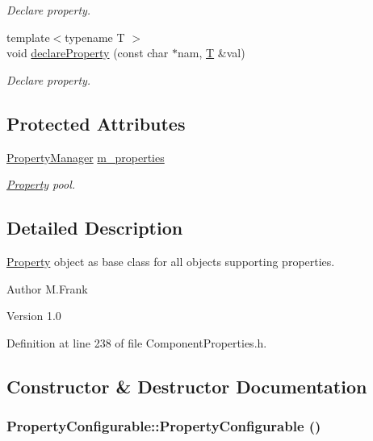\begin{DoxyCompactItemize}
\begin{DoxyCompactList}\small\item\em Declare property. \item\end{DoxyCompactList}\item 
{\footnotesize template$<$typename T $>$ }\\void \hyperlink{class_d_d4hep_1_1_property_configurable_a6e52fd581e87ae0e81a5690d071f58dc}{declareProperty} (const char $\ast$nam, \hyperlink{class_t}{T} \&val)
\begin{DoxyCompactList}\small\item\em Declare property. \item\end{DoxyCompactList}\end{DoxyCompactItemize}
\subsection*{Protected Attributes}
\begin{DoxyCompactItemize}
\item 
\hyperlink{class_d_d4hep_1_1_property_manager}{PropertyManager} \hyperlink{class_d_d4hep_1_1_property_configurable_a5c68f50853fc154e348be09d10d3f0cf}{m\_\-properties}
\begin{DoxyCompactList}\small\item\em \hyperlink{class_d_d4hep_1_1_property}{Property} pool. \item\end{DoxyCompactList}\end{DoxyCompactItemize}


\subsection{Detailed Description}
\hyperlink{class_d_d4hep_1_1_property}{Property} object as base class for all objects supporting properties. \begin{DoxyAuthor}{Author}
M.Frank 
\end{DoxyAuthor}
\begin{DoxyVersion}{Version}
1.0 
\end{DoxyVersion}


Definition at line 238 of file ComponentProperties.h.

\subsection{Constructor \& Destructor Documentation}
\hypertarget{class_d_d4hep_1_1_property_configurable_a06572f4bb82632232b0b503f56fda784}{
\subsubsection[{PropertyConfigurable}]{\setlength{\rightskip}{0pt plus 5cm}PropertyConfigurable::PropertyConfigurable ()}}
\label{class_d_d4hep_1_1_property_configurable_a06572f4bb82632232b0b503f56fda784}


